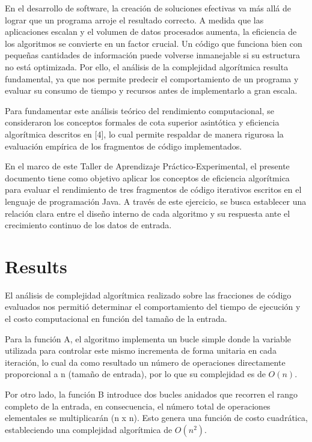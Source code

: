 \documentclass[pdflatex,sn-mathphys-num]{sn-jnl}%
\theoremstyle{thmstyleone}%
\theoremstyle{thmstyletwo}%
\theoremstyle{thmstylethree}%
\begin{document}
En el desarrollo de software, la creación de soluciones efectivas va más allá de lograr que un programa arroje el resultado correcto. A medida que las aplicaciones escalan y el volumen de datos procesados aumenta, la eficiencia de los algoritmos se convierte en un factor crucial. Un código que funciona bien con pequeñas cantidades de información puede volverse inmanejable si su estructura no está optimizada. Por ello, el análisis de la complejidad algorítmica resulta fundamental, ya que nos permite predecir el comportamiento de un programa y evaluar su consumo de tiempo y recursos antes de implementarlo a gran escala.

Para fundamentar este análisis teórico del rendimiento computacional, se consideraron los conceptos formales de cota superior asintótica y eficiencia algorítmica descritos en [4], lo cual permite respaldar de manera rigurosa la evaluación empírica de los fragmentos de código implementados.

En el marco de este Taller de Aprendizaje Práctico-Experimental, el presente documento tiene como objetivo aplicar los conceptos de eficiencia algorítmica para evaluar el rendimiento de tres fragmentos de código iterativos escritos en el lenguaje de programación Java. A través de este ejercicio, se busca establecer una relación clara entre el diseño interno de cada algoritmo y su respuesta ante el crecimiento continuo de los datos de entrada.

\section{Results}\label{sec2}

El análisis de complejidad algorítmica realizado sobre las fracciones de código evaluados nos permitió determinar el comportamiento del tiempo de ejecución y el costo computacional en función del tamaño de la entrada.

Para la función A, el algoritmo implementa un bucle simple donde la variable utilizada para controlar este mismo incrementa de forma unitaria en cada iteración, lo cual da como resultado un número de operaciones directamente proporcional a n (tamaño de entrada), por lo que su complejidad es de $O(n)$.

Por otro lado, la función B introduce dos bucles anidados que recorren el rango completo de la entrada, en consecuencia, el número total de operaciones elementales se multiplicarán (n x n). Esto genera una función de costo cuadrática, estableciendo una complejidad algorítmica de $O(n^2)$.
\end{document}
